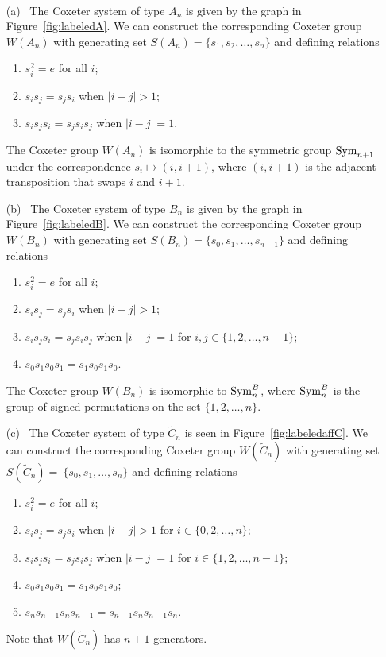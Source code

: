 \begin{example}
~
\begin{itemize}
\item[(a)~] The Coxeter system of type $A_n$ is given by the graph in Figure~\ref{fig:labeledA}. We can construct the corresponding Coxeter group $W(A_n)$ with generating set $S(A_n)=\{s_1, s_2, \ldots ,s_n\}$ and defining relations
\begin{enumerate}[leftmargin=2cm]
	\item $s_i^2=e$ for all $i$;
	\item $s_is_j=s_js_i$ when $|i-j|>1$;
	\item $s_is_js_i=s_js_is_j$ when $|i-j|=1.$
\end{enumerate}
The Coxeter group $W(A_n)$ is isomorphic to the symmetric group $\mathrm{Sym}_{n+1}$ under the correspondence $s_i \mapsto (i, i+1)$, where $(i, i+1)$ is the adjacent transposition that swaps $i$ and $i+1$.
\item[(b)~]\label{ex:B} The Coxeter system of type $B_n$ is given by the graph in Figure~\ref{fig:labeledB}. We can construct the corresponding Coxeter group $W(B_n)$ with generating set $S(B_n)=\{s_0,s_1, \ldots ,s_{n-1}\}$ and defining relations
\begin{enumerate}[leftmargin=2cm]
	\item $s_i^2=e$ for all $i$;
	\item $s_is_j=s_js_i$  when $|i-j|>1$;
	\item $s_is_js_i=s_js_is_j$ when $|i-j|=1$ for $i,j \in \{1,2,\ldots, n-1\}$;
	\item $s_0s_1s_0s_1=s_1s_0s_1s_0$.
\end{enumerate}
The Coxeter group $W(B_n)$ is isomorphic to $\mathrm{Sym}_n^B$, where $\mathrm{Sym}_n^B$ is the group of signed permutations on the set $\{1,2, \ldots,n\}$. 
\item[(c)~] The Coxeter system of type $\widetilde C_n$ is seen in Figure~\ref{fig:labeledaffC}. We can construct the corresponding Coxeter group $W(\widetilde C_n)$ with generating set $S(\widetilde{C}_n)=~\{s_0, s_1, \ldots ,s_n\}$ and defining relations 
\begin{enumerate}[leftmargin=2cm]
	\item $s_i^2=e$ for all $i$;
	\item $s_is_j=s_js_i$ when $|i-j|>1$ for $i \in \{0,2, \ldots, n\}$;
	\item $s_is_js_i=s_js_is_j$ 	when $|i-j|=1$ for $i \in \{1,2, \ldots, n-1\}$;
	\item $s_0s_1s_0s_1=s_1s_0s_1s_0$;
	\item $s_ns_{n-1}s_ns_{n-1}=s_{n-1}s_ns_{n-1}s_n.$
\end{enumerate}
Note that $W(\widetilde{C}_n)$ has $n+1$ generators.
\end{itemize}
\end{example}



